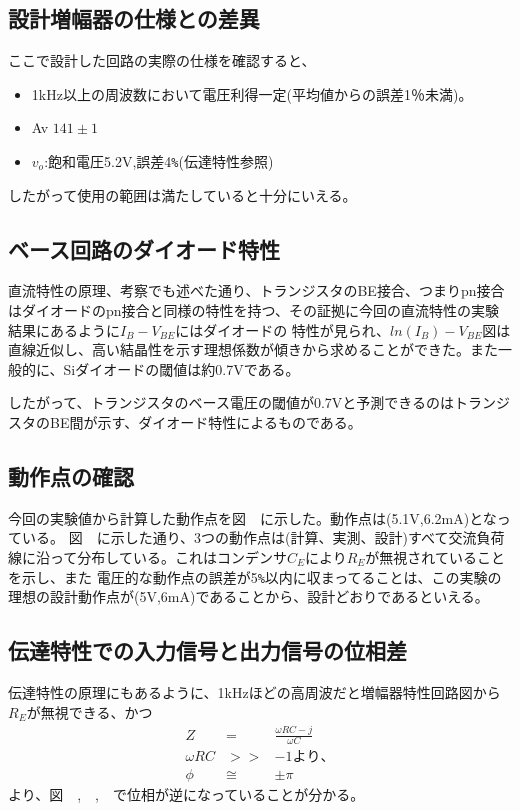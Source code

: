 \documentclass[11pt,a4j,titlepage]{jsarticle}
\begin{document}
 \subsection{設計増幅器の仕様との差異}
  ここで設計した回路の実際の仕様を確認すると、
 \begin{itemize}
  \item 1kHz以上の周波数において電圧利得一定(平均値からの誤差1％未満)。
  \item Av $141 \pm 1$
  \item $v_o$:飽和電圧5.2V,誤差4\verb|%|(伝達特性参照)
 \end{itemize}
  したがって使用の範囲は満たしていると十分にいえる。
  
 \subsection{ベース回路のダイオード特性}
 直流特性の原理、考察でも述べた通り、トランジスタのBE接合、つまりpn接合はダイオードのpn接合と同様の特性を持つ、その証拠に今回の直流特性の実験結果にあるように$I_B-V_{BE}$にはダイオードの
 特性が見られ、$ln(I_B)-V_{BE}$図は直線近似し、高い結晶性を示す理想係数が傾きから求めることができた。また一般的に、Siダイオードの閾値は約0.7Vである。
 
 したがって、トランジスタのベース電圧の閾値が0.7Vと予測できるのはトランジスタのBE間が示す、ダイオード特性によるものである。
 
 \subsection{動作点の確認}
 今回の実験値から計算した動作点を図\ \ に示した。動作点は(5.1V,6.2mA)となっている。
 図\ \ に示した通り、3つの動作点は(計算、実測、設計)すべて交流負荷線に沿って分布している。これはコンデンサ$C_E$により$R_E$が無視されていることを示し、また
 電圧的な動作点の誤差が5\verb|%|以内に収まってることは、この実験の理想の設計動作点が(5V,6mA)であることから、設計どおりであるといえる。
 
 \subsection{伝達特性での入力信号と出力信号の位相差}
 伝達特性の原理にもあるように、1kHzほどの高周波だと増幅器特性回路図から$R_E$が無視できる、かつ
 \begin{eqnarray}
  Z &=& \frac{\omega RC - j}{\omega C} \nonumber \\
  \omega RC &>>& -1 より、 \nonumber \\
  \phi &\cong& \pm \pi \nonumber
 \end{eqnarray}
 より、図\ \ ,\ \ ,\ \ で位相が逆になっていることが分かる。
 
\end{document}
